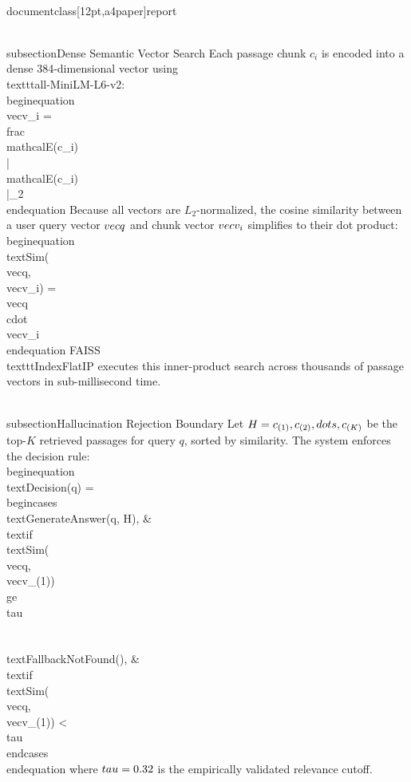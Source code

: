 \\documentclass[12pt,a4paper]{report}
\begin{document}
\\subsection{Dense Semantic Vector Search}
Each passage chunk $c_i$ is encoded into a dense 384-dimensional vector using \\texttt{all-MiniLM-L6-v2}:
\\begin{equation}
    \\vec{v}_i = \\frac{\\mathcal{E}(c_i)}{\\|\\mathcal{E}(c_i)\\|_2}
\\end{equation}
Because all vectors are $L_2$-normalized, the cosine similarity between a user query vector $\\vec{q}$ and chunk vector $\\vec{v}_i$ simplifies to their dot product:
\\begin{equation}
    \\text{Sim}(\\vec{q}, \\vec{v}_i) = \\vec{q} \\cdot \\vec{v}_i
\\end{equation}
FAISS \\texttt{IndexFlatIP} executes this inner-product search across thousands of passage vectors in sub-millisecond time.

\\subsection{Hallucination Rejection Boundary}
Let $H = \\{c_{(1)}, c_{(2)}, \\dots, c_{(K)}\\}$ be the top-$K$ retrieved passages for query $q$, sorted by similarity. The system enforces the decision rule:
\\begin{equation}
    \\text{Decision}(q) = 
    \\begin{cases} 
        \\text{GenerateAnswer}(q, H), & \\text{if } \\text{Sim}(\\vec{q}, \\vec{v}_{(1)}) \\ge \\tau \\\\
        \\text{FallbackNotFound}(), & \\text{if } \\text{Sim}(\\vec{q}, \\vec{v}_{(1)}) < \\tau
    \\end{cases}
\\end{equation}
where $\\tau = 0.32$ is the empirically validated relevance cutoff.
\end{document}
